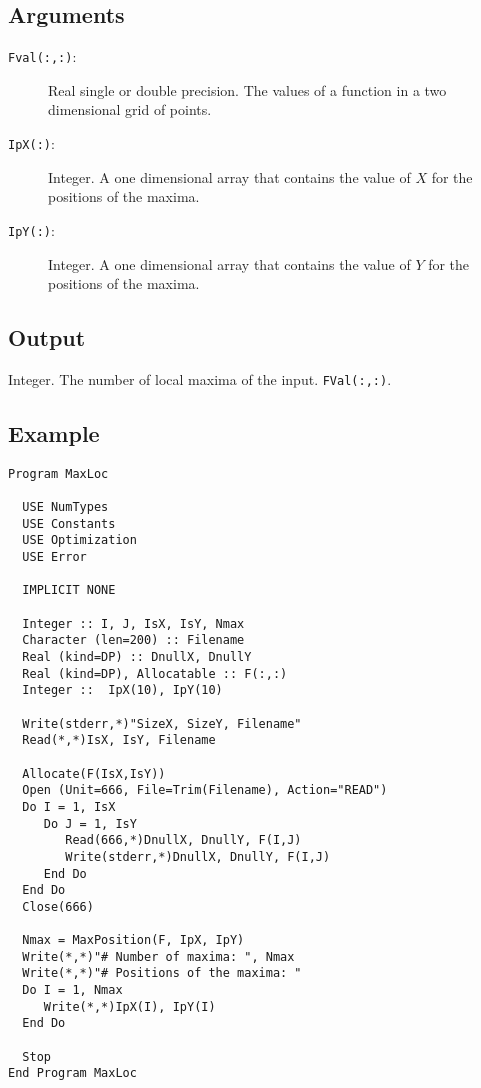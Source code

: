 \subsection{Arguments}

\begin{description}
\item[\texttt{Fval(:,:)}:] Real single or double precision. The values
  of a function in a two dimensional grid of points.

\item[\texttt{IpX(:)}:] Integer. A one dimensional array that contains
  the value of $X$ for the positions of the maxima.

\item[\texttt{IpY(:)}:] Integer. A one dimensional array that contains
  the value of $Y$ for the positions of the maxima.

\end{description}

\subsection{Output}

Integer. The number of local maxima of the input.
\texttt{FVal(:,:)}. 

\subsection{Example}

\begin{lstlisting}[emph=MaxPosition,emphstyle=\color{blue},frame=trBL,caption=Example
  of the usage of the routine \texttt{MaxPosition}., label=MaxPosition]
Program MaxLoc

  USE NumTypes
  USE Constants 
  USE Optimization
  USE Error
  
  IMPLICIT NONE

  Integer :: I, J, IsX, IsY, Nmax
  Character (len=200) :: Filename
  Real (kind=DP) :: DnullX, DnullY
  Real (kind=DP), Allocatable :: F(:,:)
  Integer ::  IpX(10), IpY(10)

  Write(stderr,*)"SizeX, SizeY, Filename"
  Read(*,*)IsX, IsY, Filename

  Allocate(F(IsX,IsY))
  Open (Unit=666, File=Trim(Filename), Action="READ")
  Do I = 1, IsX
     Do J = 1, IsY
        Read(666,*)DnullX, DnullY, F(I,J)
        Write(stderr,*)DnullX, DnullY, F(I,J)
     End Do
  End Do
  Close(666)

  Nmax = MaxPosition(F, IpX, IpY)
  Write(*,*)"# Number of maxima: ", Nmax
  Write(*,*)"# Positions of the maxima: "
  Do I = 1, Nmax
     Write(*,*)IpX(I), IpY(I)
  End Do

  Stop
End Program MaxLoc
\end{lstlisting}




